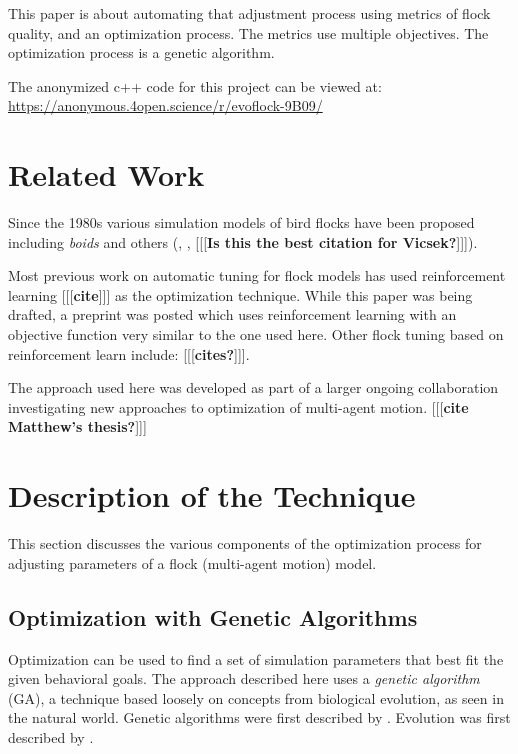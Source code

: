 \documentclass[letterpaper]{article}
\begin{document}
This paper is about automating that adjustment process using metrics of flock quality, and an optimization process. The metrics use multiple objectives. The optimization process is a genetic algorithm.

The anonymized c++ code for this project can be viewed at:
\scriptsize
\url{https://anonymous.4open.science/r/evoflock-9B09/}
\normalsize

\section{Related Work}
\label{sec:related}

Since the 1980s various simulation models of bird flocks have been proposed including \textit{boids} \citep{reynolds_flocks_1987} and others (\citet{aoki_simulation_1982}, \citet{cucker_emergent_2007}, \citet{bhattacharya_collective_2010} [[[\textbf{Is this the best citation for Vicsek?}]]]).

Most previous work on automatic tuning for flock models has used reinforcement learning [[[\textbf{cite}]]] as the optimization technique. While this paper was being drafted, a preprint was posted \citep{brambati_learning_2025} which uses reinforcement learning with an objective function very similar to the one used here. Other flock tuning based on reinforcement learn include:
[[[\textbf{cites?}]]].


The approach used here was developed as part of a larger ongoing collaboration investigating new approaches to optimization of multi-agent motion. [[[\textbf{cite Matthew's thesis?}]]]

\section{Description of the Technique}
\label{sec:Description}

This section discusses the various components of the optimization process for adjusting parameters of a flock (multi-agent motion) model.

\subsection{Optimization with Genetic Algorithms}
\label{subsec:Optimization_with_GA}

Optimization can be used to find a set of simulation parameters that best fit the given behavioral goals. The approach described here uses a \textit{genetic algorithm} (GA), a technique based loosely on concepts from biological evolution, as seen in the natural world. Genetic algorithms were first described by \citet{holland_adaptation_1975}. Evolution was first described by \citet{darwin_origin_1859}.
\end{document}
